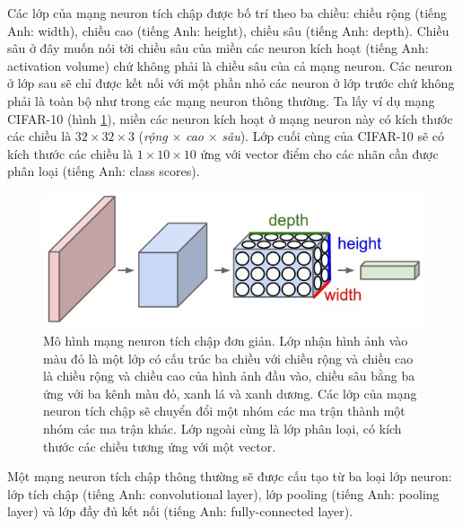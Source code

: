 Các lớp của mạng neuron tích chập được bố trí theo ba chiều: chiều rộng (tiếng Anh: width), chiều cao (tiếng Anh: height), chiều sâu (tiếng Anh: depth). Chiều sâu ở đây muốn nói tời chiều sâu của miền các neuron kích hoạt (tiếng Anh: activation volume) chứ không phải là chiều sâu của cả mạng neuron. Các neuron ở lớp sau sẽ chỉ được kết nối với một phần nhỏ các neuron ở lớp trước chứ không phải là toàn bộ như trong các mạng neuron thông thường. Ta lấy ví dụ mạng CIFAR-10 (hình \ref{fig:cnn}), miền các neuron kích hoạt ở mạng neuron này có kích thước các chiều là $32{\times}32{\times}3$ (\emph{rộng} ${\times}$ \emph{cao} ${\times}$ \emph{sâu}). Lớp cuối cùng của CIFAR-10 sẽ có kích thước các chiều là $1{\times}10{\times}10$ ứng với vector điểm cho các nhãn cần được phân loại (tiếng Anh: class scores).
\begin{figure}[ht!]
	\centerline{\includegraphics[scale=0.6]{images/cnn.jpeg}}
  	\caption{Mô hình mạng neuron tích chập đơn giản. Lớp nhận hình ảnh vào màu đỏ là một lớp có cấu trúc ba chiều với chiều rộng và chiều cao là chiều rộng và chiều cao của hình ảnh đầu vào, chiều sâu bằng ba ứng với ba kênh màu đỏ, xanh lá và xanh dương. Các lớp của mạng neuron tích chập sẽ chuyển đổi một nhóm các ma trận thành một nhóm các ma trận khác. Lớp ngoài cùng là lớp phân loại, có kích thước các chiều tương ứng với một vector.}
  	\label{fig:cnn}
\end{figure}
Một mạng neuron tích chập thông thường sẽ được cấu tạo từ ba loại lớp neuron: lớp tích chập (tiếng Anh: convolutional layer), lớp pooling (tiếng Anh: pooling layer) và lớp đầy đủ kết nối (tiếng Anh: fully-connected layer).
